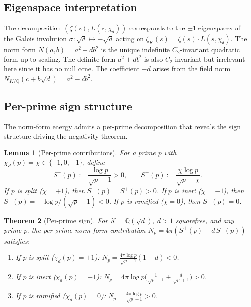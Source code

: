 \documentclass[12pt,reqno]{amsart}
\theoremstyle{plain}
\newtheorem{theorem}{Theorem}[section]
\newtheorem{lemma}[theorem]{Lemma}
\theoremstyle{definition}
\theoremstyle{remark}
\newcommand{\Q}{\mathbb{Q}}
\begin{document}
\subsection{Eigenspace interpretation}

The decomposition $(\zeta(s), L(s, \chi_d))$ corresponds to the $\pm 1$ eigenspaces of the Galois involution $\sigma: \sqrt{d} \mapsto -\sqrt{d}$ acting on $\zeta_K(s) = \zeta(s) \cdot L(s, \chi_d)$. The norm form $N(a, b) = a^2 - db^2$ is the unique indefinite $C_2$-invariant quadratic form up to scaling. The definite form $a^2 + db^2$ is also $C_2$-invariant but irrelevant here since it has no null cone. The coefficient $-d$ arises from the field norm $N_{K/\Q}(a + b\sqrt{d}) = a^2 - db^2$.

\subsection{Per-prime sign structure}

The norm-form energy admits a per-prime decomposition that reveals the sign structure driving the negativity theorem.

\begin{lemma}[Per-prime contributions]\label{lem:per-prime}
For a prime $p$ with $\chi_d(p) = \chi \in \{-1, 0, +1\}$, define
\[
S^+(p) := \frac{\log p}{\sqrt{p}-1} > 0, \qquad
S^-(p) := \frac{\chi\log p}{\sqrt{p}-\chi}.
\]
If $p$ is split ($\chi = +1$), then $S^-(p) = S^+(p) > 0$. If $p$ is inert ($\chi = -1$), then $S^-(p) = -\log p/(\sqrt{p}+1) < 0$. If $p$ is ramified ($\chi = 0$), then $S^-(p) = 0$.
\end{lemma}

\begin{theorem}[Per-prime sign]\label{thm:per-prime-sign}
For $K = \Q(\sqrt{d})$, $d > 1$ squarefree, and any prime $p$, the per-prime norm-form contribution $N_p = 4\pi(S^+(p) - d\,S^-(p))$ satisfies:
\begin{enumerate}[label=\textup{(\alph*)}]
\item If $p$ is split ($\chi_d(p) = +1$): $N_p = \frac{4\pi\log p}{\sqrt{p}-1}(1 - d) < 0$.
\item If $p$ is inert ($\chi_d(p) = -1$): $N_p = 4\pi\log p\bigl(\frac{1}{\sqrt{p}-1} + \frac{d}{\sqrt{p}+1}\bigr) > 0$.
\item If $p$ is ramified ($\chi_d(p) = 0$): $N_p = \frac{4\pi\log p}{\sqrt{p}-1} > 0$.
\end{enumerate}
\end{theorem}
\end{document}
